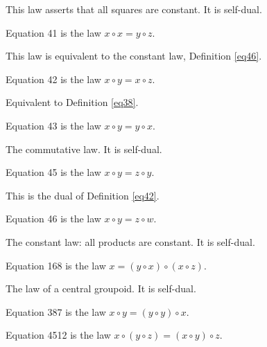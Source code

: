 This law asserts that all squares are constant. It is self-dual.

\begin{definition}[Equation 41]\label{eq41}\leanok{}  Equation 41 is the law $x \circ x = y \circ z$.
\end{definition}

This law is equivalent to the constant law, Definition \ref{eq46}.

\begin{definition}[Equation 42]\label{eq42}\leanok{}  Equation 42 is the law $x \circ y = x \circ z$.
\end{definition}

Equivalent to Definition \ref{eq38}.

\begin{definition}[Equation 43]\label{eq43}\leanok{}  Equation 43 is the law $x \circ y = y \circ x$.
\end{definition}

The commutative law. It is self-dual.

\begin{definition}[Equation 45]\label{eq45}\leanok{}  Equation 45 is the law $x \circ y = z \circ y$.
\end{definition}

This is the dual of Definition \ref{eq42}.

\begin{definition}[Equation 46]\label{eq46}\leanok{}  Equation 46 is the law $x \circ y = z \circ w$.
\end{definition}

The constant law: all products are constant. It is self-dual.

\begin{definition}[Equation 168]\label{eq168}\leanok{}  Equation 168 is the law $x = (y \circ x) \circ (x \circ z)$.
\end{definition}

The law of a central groupoid. It is self-dual.

\begin{definition}[Equation 387]\label{eq387}\leanok{}  Equation 387 is the law $x \circ y = (y \circ y) \circ x$.
\end{definition}


\begin{definition}[Equation 4512]\label{eq4512}\leanok{}  Equation 4512 is the law $x \circ (y \circ z) = (x \circ y) \circ z$.
\end{definition}

